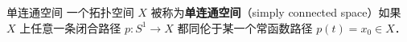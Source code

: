 

\begin{issues}
\issueDraft
\end{issues}


\begin{definition}{单连通空间}\label{SmpCn_def1}
一个拓扑空间 $X$ 被称为\textbf{单连通空间}（simply connected space）如果 $X$ 上任意一条闭合路径 $p: S^1 \to X$ 都同伦于某一个常函数路径 $p(t) = x_0 \in X$．
\end{definition}